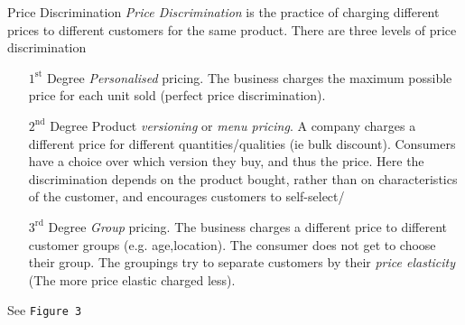 \documentclass[11pt,a4paper]{article}
\begin{document}
\begin{definition}{Price Discrimination}
  \textit{Price Discrimination} is the practice of charging different prices to different customers for the same product. There are three levels of price discrimination
  \begin{itemize}
    \item[$1^\text{st}$ Degree]  \textit{Personalised} pricing. The business charges the maximum possible price for each unit sold (perfect price discrimination).
    \item[$2^\text{nd}$ Degree]  Product \textit{versioning} or \textit{menu pricing}. A company charges a different price for different quantities/qualities (ie bulk discount). Consumers have a choice over which version they buy, and thus the price. Here the discrimination depends on the product bought, rather than on characteristics of the customer, and encourages customers to self-select/
    \item[$3^\text{rd}$ Degree]  \textit{Group} pricing. The business charges a different price to different customer groups (e.g. age,location). The consumer does not get to choose their group. The groupings try to separate customers by their \textit{price elasticity} (The more price elastic charged less).
  \end{itemize}
  See \texttt{Figure 3}


\end{definition}
\end{document}
